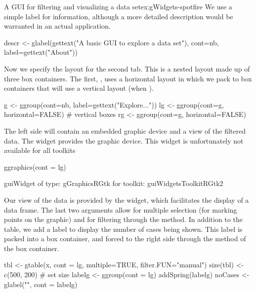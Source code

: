 \begin{example}{A GUI for filtering and visualizing a data set}{ex:gWidgets-spotfire}
We use a simple label for information, although a more detailed
description would be warranted in an actual application.

\begin{Schunk}
\begin{Sinput}
 descr <- glabel(gettext("A basic GUI to explore a data set"), 
                 cont=nb, label=gettext("About"))
\end{Sinput}
\end{Schunk}
%
Now we specify the layout for the second tab. This is a nested layout
made up of three box containers. The first, , uses a
horizontal layout in which we pack to box containers that will use a
vertical layout (when ). 

\begin{Schunk}
\begin{Sinput}
 g <- ggroup(cont=nb, label=gettext("Explore..."))
 lg <- ggroup(cont=g, horizontal=FALSE) # vertical boxes
 rg <- ggroup(cont=g, horizontal=FALSE)
\end{Sinput}
\end{Schunk}

The left side will contain an embedded graphic device and a view of
the filtered data. The  widget provides the
graphic device. This widget is unfortunately not available for all toolkits
\begin{Schunk}
\begin{Sinput}
 ggraphics(cont = lg)
\end{Sinput}
\begin{Soutput}
guiWidget of type: gGraphicsRGtk for toolkit: guiWidgetsToolkitRGtk2 
\end{Soutput}
\end{Schunk}

Our view of the data is provided by the  widget,
which facilitates the display of a data frame. The last two arguments
allow for multiple selection (for marking points on the graphic) and
for filtering through the  method.
In addition to the table, we add a label to display the number of
cases being shown. This label is packed into a box container, and
forced to the right side through the  method
of the box container.
\begin{Schunk}
\begin{Sinput}
 tbl <- gtable(x, cont = lg, multiple=TRUE, filter.FUN="manual")
 size(tbl) <- c(500, 200)                # set size
 labelg <- ggroup(cont = lg)
 addSpring(labelg)
 noCases <- glabel("", cont = labelg)
\end{Sinput}
\end{Schunk}


\end{example}
